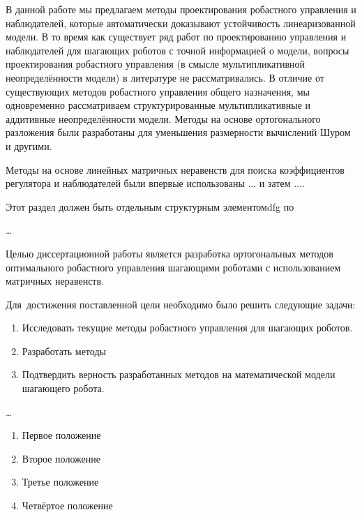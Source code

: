 В данной работе мы предлагаем методы проектирования робастного управления и наблюдателей, которые автоматически доказывают устойчивость линеаризованной модели. В то время как существует ряд работ по проектированию управления и наблюдателей для шагающих роботов с точной информацией о модели, вопросы проектирования робастного управления (в смысле мультипликативной неопределённости модели) в литературе не рассматривались. В отличие от существующих методов робастного управления общего назначения, мы одновременно рассматриваем структурированные мультипликативные и аддитивные неопределённости модели.
Методы на основе ортогонального разложения были разработаны для уменьшения размерности вычислений Шуром и другими.

Методы на основе линейных матричных неравенств для поиска коэффициентов регулятора и наблюдателей были впервые использованы ... и затем ....


{\progress}
Этот раздел должен быть отдельным структурным элементомdfg по

{\objectsubject} \ldots

{\aimtasks} 
Целью диссертационной работы является разработка ортогональных методов оптимального робастного управления шагающими роботами с использованием матричных неравенств.

Для~достижения поставленной цели необходимо было решить следующие задачи:
\begin{enumerate}[beginpenalty=10000] %
	\item Исследовать текущие методы робастного управления для шагающих роботов.
	\item Разработать методы
	\item Подтвердить верность разработанных методов на математической модели шагающего робота.
\end{enumerate}

{\methods} \ldots

{}
\begin{enumerate}[beginpenalty=10000] %
	\item Первое положение
	\item Второе положение
	\item Третье положение
	\item Четвёртое положение
\end{enumerate}

